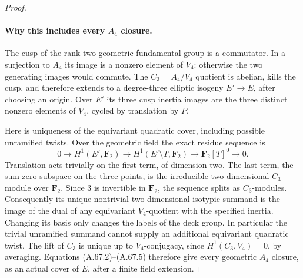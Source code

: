 \begin{proof}
\paragraph{Why this includes every \(A_4\) closure.}
The cusp of the rank-two geometric fundamental group is a
commutator. In a surjection to \(A_4\) its image is a nonzero
element of \(V_4\): otherwise the two generating images would
commute. The \(C_3=A_4/V_4\) quotient is abelian, kills the cusp,
and therefore extends to a degree-three elliptic isogeny
\(E'\to E\), after choosing an origin. Over \(E'\) its three
cusp inertia images are the three distinct nonzero elements
of \(V_4\), cycled by translation by \(P\).

Here is uniqueness of the equivariant quadratic cover, including
possible unramified twists. Over the geometric field the exact
residue sequence is
\[
 0\longrightarrow H^1(E',\mathbf F_2)
 \longrightarrow H^1(E'\setminus T,\mathbf F_2)
 \longrightarrow \mathbf F_2[T]^0\longrightarrow0.
                                                               \tag{A.67.6}
\]
Translation acts trivially on the first term, of dimension two.
The last term, the sum-zero subspace on the three points, is the
irreducible two-dimensional \(C_3\)-module over \(\mathbf F_2\).
Since \(3\) is invertible in \(\mathbf F_2\), the sequence splits
as \(C_3\)-modules. Consequently its unique nontrivial
two-dimensional isotypic summand is the image of the dual of
any equivariant \(V_4\)-quotient with the specified inertia.
Changing its basis only changes the labels of the deck group.
In particular the trivial unramified summand cannot supply an
additional equivariant quadratic twist. The lift of \(C_3\)
is unique up to \(V_4\)-conjugacy, since
\(H^1(C_3,V_4)=0\), by averaging. Equations (A.67.2)--(A.67.5)
therefore give every geometric \(A_4\) closure, as an actual
cover of \(E\), after a finite field extension.


\end{proof}
